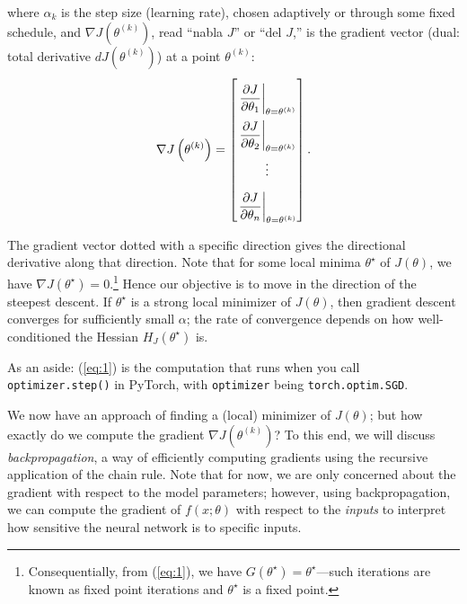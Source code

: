 where $\alpha_k$ is the step size (learning rate), chosen adaptively or through some fixed schedule, and $\nabla J\left(\theta^{(k)}\right)$, read ``nabla $J$'' or ``del $J$,'' is the gradient vector (dual: total derivative $dJ\left(\theta^{(k)}\right)$) at a point $\theta^{(k)}$: 
\begin{align}
\renewcommand{\arraystretch}{2.3}
\label{eq:2}
\nabla J\left(\theta^{(k)}\right) = \begin{bmatrix}
\left.\dfrac{\partial J}{\partial \theta_1}\right\vert_{\theta=\theta^{(k)}} \\
\left.\dfrac{\partial J}{\partial \theta_2}\right\vert_{\theta=\theta^{(k)}} \\
\vdots \\
\left.\dfrac{\partial J}{\partial \theta_n}\right\vert_{\theta=\theta^{(k)}}
\end{bmatrix}.
\renewcommand{\arraystretch}{1.5}
\end{align}

The gradient vector dotted with a specific direction gives the directional derivative along that direction. Note that for some local minima $\theta^\star$ of $J(\theta)$, we have $\nabla J(\theta^\star) = 0$.\footnote{Consequentially, from (\ref{eq:1}), we have $G(\theta^\star) = \theta^\star$---such iterations are known as fixed point iterations and $\theta^\star$ is a fixed point.} Hence our objective is to move in the direction of the steepest descent. If $\theta^\star$ is a strong local minimizer of $J(\theta)$, then gradient descent converges for sufficiently small $\alpha$; the rate of convergence depends on how well-conditioned the Hessian $H_J(\theta^\star)$ is.

As an aside: (\ref{eq:1}) is the computation that runs when you call \texttt{optimizer.step()} in PyTorch, with \texttt{optimizer} being \texttt{torch.optim.SGD}.

We now have an approach of finding a (local) minimizer of $J(\theta)$; but how exactly do we compute the gradient $\nabla J\left(\theta^{(k)}\right)$? To this end, we will discuss \textit{backpropagation}, a way of efficiently computing gradients using the recursive application of the chain rule. Note that for now, we are only concerned about the gradient with respect to the model parameters; however, using backpropagation, we can compute the gradient of $f(x; \theta)$ with respect to the \textit{inputs} to interpret how sensitive the neural network is to specific inputs.
